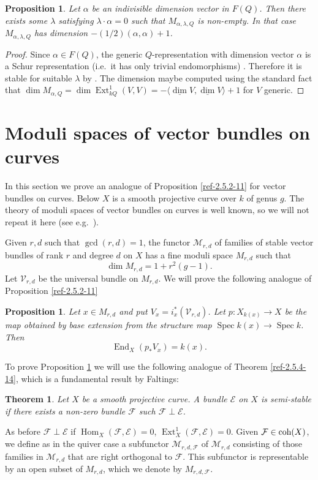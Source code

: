 \documentclass{amsart}
\numberwithin{equation}{section}
\let\cal\mathcal
\newtheorem{proposition}[lemma]{Proposition}
\newtheorem{theorem}[lemma]{Theorem}
\newtheorem{propositions}[lemmas]{Proposition}
\theoremstyle{definition}
\theoremstyle{remark}
\begin{document}
\begin{propositions} \label{ref-2.5.7-17} \cite{Kac1,King,Schofield99} Let $\alpha$ be an indivisible dimension vector in $F(Q)$. Then there exists some
$\lambda$ satisfying $\lambda\cdot \alpha=0$ such
that $M_{\alpha,\lambda,Q}$ is non-empty. In that case $M_{\alpha,\lambda,Q}$  has dimension $-(1/2)(\alpha,\alpha)+1$.
\end{propositions}
\begin{proof}
Since $\alpha\in F(Q)$, the generic $Q$-representation  with dimension vector $\alpha$ is a Schur representation (i.e.\ it has only trivial endomorphisms) \cite{Kac1}. Therefore it is stable for suitable $\lambda$ by
\cite[Theorem 6.1]{Schofield92}. The dimension maybe computed using the standard fact that $\dim M_{\alpha,Q}=\dim {\operatorname {Ext}}^1_{kQ}(V,V)=-\langle {\operatorname{\underline{\dim}}} V,{\operatorname{\underline{\dim}}} V\rangle+1$
for $V$ generic. 
\end{proof}

\section{Moduli spaces of vector bundles on curves}
\label{ref-3-18}
In this section we prove an analogue of Proposition \ref{ref-2.5.2-11} for vector bundles on curves.
Below $X$ is a smooth projective curve over $k$ of genus $g$.
The theory of moduli spaces of vector bundles on curves is well known, so we will not repeat it here (see e.g.\ \cite{newstead}).

Given $r,d$ such that $\gcd(r,d)=1$, 
the functor ${{\cal M}}_{r,d}$ of families of stable vector bundles of rank $r$
and degree $d$ on $X$ has a fine moduli space $M_{r,d}$  such that
\[
\dim M_{r,d}=1+r^2(g-1).
\]
Let ${{\cal V}}_{r,d}$ be the universal bundle on $M_{r,d}$. We will prove the following analogue of 
Proposition \ref{ref-2.5.2-11}
\begin{proposition} \label{ref-3.1-19} Let $x\in M_{r,d}$ and put $V_x=i_x^\ast({{\cal V}}_{r,d})$. Let $p:X_{k(x)}{\rightarrow} X$
be the map obtained by base extension from the structure map ${\operatorname {Spec}} k(x){\rightarrow} {\operatorname {Spec}} k$. Then
\[
{\operatorname {End}}_X(p_\ast V_x)=k(x).
\]
\end{proposition}
To prove Proposition \ref{ref-3.1-19} 
we will use the
following analogue of Theorem \ref{ref-2.5.4-14},
which is  a fundamental result by Faltings:
\begin{theorem} \cite{Faltings}
Let $X$ be a smooth projective curve. A bundle ${{\cal E}}$ on $X$ is semi-stable if there exists a non-zero
bundle ${{\cal F}}$ such ${{\cal F}}\perp{{\cal E}}$.
\end{theorem}
As before ${{\cal F}}\perp{{\cal E}}$ if ${\operatorname {Hom}}_X({{\cal F}},{{\cal E}})=0$, ${\operatorname {Ext}}^1_X({{\cal F}},{{\cal E}})=0$. 
Given ${{\cal F}}\in {\mathop{\text{\upshape{coh}}}}(X)$, we define as in the quiver
case a subfunctor ${{\cal M}}_{r,d,{{\cal F}}}$ of ${{\cal M}}_{r,d}$ consisting of those families in ${{\cal M}}_{r,d}$
that are right orthogonal to ${{\cal F}}$. This subfunctor is representable by
an open subset of $M_{r,d}$, which we denote by $M_{r,d,{{\cal F}}}$.
\end{document}
